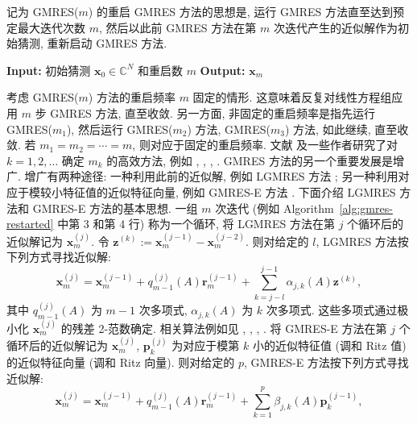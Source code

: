{记为 GMRES($m$) 的重启 GMRES 方法的思想是, 运行 GMRES 方法直至达到预定最大迭代次数 $m$, 然后以此前 GMRES 方法在第 $m$ 次迭代产生的近似解作为初始猜测, 重新启动 GMRES 方法.}
\begin{algorithm}[H]\caption{{GMRES($m$) 方法}}\label{alg:gmres-restarted}\begin{algorithmic}[1]
\Statex\textbf{Input:} {初始猜测 $\bm x_0\in\mathbb C^N$ 和重启数 $m$}
\Statex\textbf{Output:} $\bm x_m$
\EndWhile\end{algorithmic}\end{algorithm}
{考虑 GMRES($m$) 方法的重启频率 $m$ 固定的情形. 这意味着反复对线性方程组应用 $m$ 步 GMRES 方法, 直至收敛. 另一方面, 非固定的重启频率是指先运行 GMRES($m_1$), 然后运行 GMRES($m_2$) 方法, GMRES($m_3$) 方法, 如此继续, 直至收敛. 若 $m_1=m_2=\cdots=m$, 则对应于固定的重启频率.}
{文献  及一些作者研究了对 $k=1,2,\ldots$ 确定 $m_k$ 的高效方法, 例如 , , , .}
{\leavevmode{}\label{idx:chapter-03-section-03:lgmres-augmentation}GMRES 方法的另一个重要发展是增广. 增广有两种途径: 一种利用此前的近似解, 例如 LGMRES 方法 ; 另一种利用对应于模较小特征值的近似特征向量, 例如 GMRES-E 方法 . 下面介绍 LGMRES 方法和 GMRES-E 方法的基本思想.}
{一组 $m$ 次迭代 (例如 Algorithm\ \ref{alg:gmres-restarted} 中第 3 和第 4 行) 称为一个循环, 将 LGMRES 方法在第 $j$ 个循环后的近似解记为 $\bm x_m^{(j)}$. 令 $\bm z^{(k)}:=\bm x_m^{(j-1)}-\bm x_m^{(j-2)}$. 则对给定的 $l$, LGMRES 方法按下列方式寻找近似解:}
\[\bm x_m^{(j)}=\bm x_m^{(j-1)}+q_{m-1}^{(j)}(A)\bm r_m^{(j-1)}+\sum_{k=j-l}^{j-1}\alpha_{j,k}(A)\bm z^{(k)},\]
{其中 $q_{m-1}^{(j)}(A)$ 为 $m-1$ 次多项式, $\alpha_{j,k}(A)$ 为 $k$ 次多项式. 这些多项式通过极小化 $\bm x_m^{(j)}$ 的残差 2-范数确定. 相关算法例如见 , , , .}
{将 GMRES-E 方法在第 $j$ 个循环后的近似解记为 $\bm x_m^{(j)}$, $\bm p_k^{(j)}$ 为对应于模第 $k$ 小的近似特征值 (调和 Ritz 值) 的近似特征向量 (调和 Ritz 向量). 则对给定的 $p$, GMRES-E 方法按下列方式寻找近似解:}
\[\bm x_m^{(j)}=\bm x_m^{(j-1)}+q_{m-1}^{(j)}(A)\bm r_m^{(j-1)}+\sum_{k=1}^{p}\beta_{j,k}(A)\bm p_k^{(j-1)},\]
